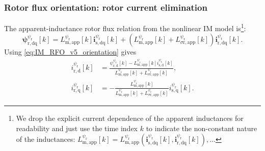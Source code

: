 \begin{frame}
    \frametitle{Rotor flux orientation: rotor current elimination}
    The apparent-inductance rotor flux relation from the nonlinear IM model is\footnote{We drop the explicit current dependence of the apparent inductances for readability and just use the time index $k$ to indicate the non-constant nature of the inductances: $L^{\psi_\mathrm{r}}_{\mathrm{m,app}}[k]=L^{\psi_\mathrm{r}}_{\mathrm{m,app}}(\bm{i}^{\psi_\mathrm{r}}_{\mathrm{s,dq}}[k],\bm{i}^{\psi_\mathrm{r}}_{\mathrm{r,dq}}[k]), \ldots$ }:
    \begin{equation}
        \bm{\psi}^{\psi_\mathrm{r}}_{\mathrm{r,dq}}[k]
        =L^{\psi_\mathrm{r}}_{\mathrm{m,app}}[k]\bm{i}^{\psi_\mathrm{r}}_{\mathrm{s,dq}}[k]
        +\left(L^{\psi_\mathrm{r}}_{\mathrm{m,app}}[k]+L^{\psi_\mathrm{r}}_{\sigma\mathrm{r,app}}[k]\right)
        \bm{i}^{\psi_\mathrm{r}}_{\mathrm{r,dq}}[k].
        \label{eq:IM_RFO_v5_apparent_rotor_flux}
    \end{equation}\pause%
    Using \eqref{eq:IM_RFO_v5_orientation} gives
    \begin{equation}
        \begin{split}
            i^{\psi_\mathrm{r}}_{\mathrm{r,d}}[k]
             & =\frac{\psi^{\psi_\mathrm{r}}_{\mathrm{r,d}}[k]
                    -L^{\psi_\mathrm{r}}_{\mathrm{m,app}}[k]i^{\psi_\mathrm{r}}_{\mathrm{s,d}}[k]}
                {L^{\psi_\mathrm{r}}_{\mathrm{m,app}}[k]+L^{\psi_\mathrm{r}}_{\sigma\mathrm{r,app}}[k]}, \\[0.6ex]
            i^{\psi_\mathrm{r}}_{\mathrm{r,q}}[k]
             & =-\frac{L^{\psi_\mathrm{r}}_{\mathrm{m,app}}[k]}
                 {L^{\psi_\mathrm{r}}_{\mathrm{m,app}}[k]+L^{\psi_\mathrm{r}}_{\sigma\mathrm{r,app}}[k]}
            i^{\psi_\mathrm{r}}_{\mathrm{s,q}}[k].
        \end{split}
        \label{eq:IM_RFO_v5_rotor_current_elimination}
    \end{equation}
\end{frame}

